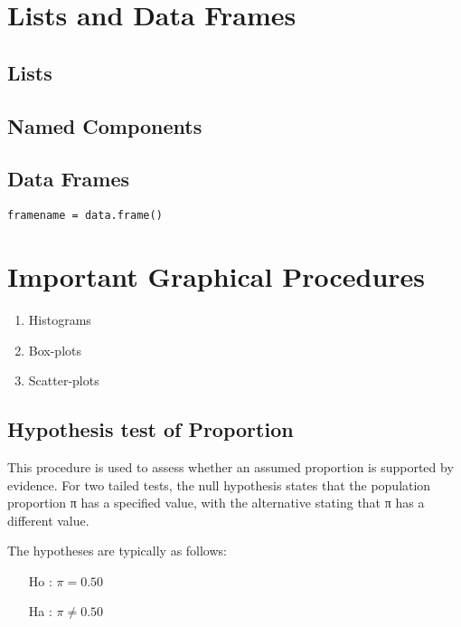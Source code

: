 \documentclass[a4paper,12pt]{article}
\begin{document}
\begin{itemize}
\begin{itemize}
\section{Lists and Data Frames}
\subsection{Lists}
\subsection{Named Components}
\subsection{Data Frames}
\begin{framed}
\begin{verbatim}
framename = data.frame()
\end{verbatim}
\end{framed}
\section{Important Graphical Procedures}
\begin{enumerate}
\item Histograms
\item Box-plots
\item Scatter-plots
\end{enumerate}




\newpage


       

\subsection{Hypothesis test of Proportion}
This procedure is used to assess whether an assumed proportion is supported by evidence. For two tailed tests, the null hypothesis states that the population proportion  π has a specified value, with the alternative stating that π has a different value. 
  
The hypotheses are typically as follows:   

\begin{itemize}
       \item[Ho] : $\pi = 0.50$
       \item[Ha] : $\pi \neq 0.50$
\end{itemize}


\end{itemize}
\end{itemize}
\end{document}
